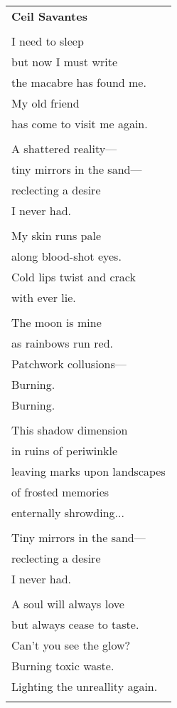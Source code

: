 \documentclass{article}
\begin{document}
\begin{center}
\begin{tabular}{l}
\textbf{Ceil Savantes} \\ %
\\
I need to sleep \\
but now I must write \\
the macabre has found me. \\
My old friend \\
has come to visit me again. \\
\\
A shattered reality--- \\
tiny mirrors in the sand--- \\
reclecting a desire \\
I never had. \\
\\
My skin runs pale \\
along blood-shot eyes. \\
Cold lips twist and crack \\
with ever lie. \\
\\
The moon is mine \\
as rainbows run red. \\
Patchwork collusions--- \\
Burning. \\
Burning. \\
\\
This shadow dimension \\
in ruins of periwinkle \\
leaving marks upon landscapes \\
of frosted memories \\
enternally shrowding... \\
\\
Tiny mirrors in the sand--- \\
reclecting a desire \\
I never had. \\
\\
A soul will always love \\
but always cease to taste. \\
Can't you see the glow? \\
Burning toxic waste. \\
Lighting the unreallity again. \\
\\

\end{tabular}
\end{center}
\end{document}
